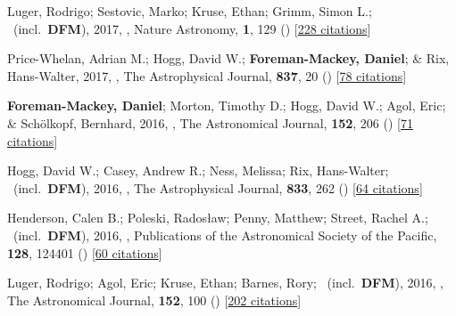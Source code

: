 \item[{\color{numcolor}\scriptsize26}] Luger, Rodrigo; Sestovic, Marko; Kruse, Ethan; Grimm, Simon L.; \etal\ (incl.\ \textbf{DFM}), 2017, , Nature Astronomy, \textbf{1}, 129 () [\href{https://ui.adsabs.harvard.edu/abs/2017NatAs...1E.129L}{228 citations}]

\item[{\color{numcolor}\scriptsize25}] Price-Whelan, Adrian M.; Hogg, David W.; \textbf{Foreman-Mackey, Daniel}; \& Rix, Hans-Walter, 2017, , The Astrophysical Journal, \textbf{837}, 20 () [\href{https://ui.adsabs.harvard.edu/abs/2017ApJ...837...20P}{78 citations}]

\item[{\color{numcolor}\scriptsize24}] \textbf{Foreman-Mackey, Daniel}; Morton, Timothy D.; Hogg, David W.; Agol, Eric; \& Sch{\"o}lkopf, Bernhard, 2016, , The Astronomical Journal, \textbf{152}, 206 () [\href{https://ui.adsabs.harvard.edu/abs/2016AJ....152..206F}{71 citations}]

\item[{\color{numcolor}\scriptsize23}] Hogg, David W.; Casey, Andrew R.; Ness, Melissa; Rix, Hans-Walter; \etal\ (incl.\ \textbf{DFM}), 2016, , The Astrophysical Journal, \textbf{833}, 262 () [\href{https://ui.adsabs.harvard.edu/abs/2016ApJ...833..262H}{64 citations}]

\item[{\color{numcolor}\scriptsize22}] Henderson, Calen B.; Poleski, Rados{\l}aw; Penny, Matthew; Street, Rachel A.; \etal\ (incl.\ \textbf{DFM}), 2016, , Publications of the Astronomical Society of the Pacific, \textbf{128}, 124401 () [\href{https://ui.adsabs.harvard.edu/abs/2016PASP..128l4401H}{60 citations}]

\item[{\color{numcolor}\scriptsize21}] Luger, Rodrigo; Agol, Eric; Kruse, Ethan; Barnes, Rory; \etal\ (incl.\ \textbf{DFM}), 2016, , The Astronomical Journal, \textbf{152}, 100 () [\href{https://ui.adsabs.harvard.edu/abs/2016AJ....152..100L}{202 citations}]

